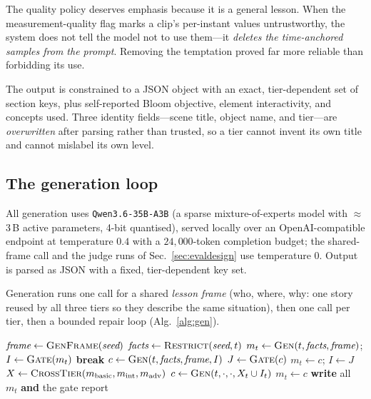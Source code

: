 \documentclass[conference]{IEEEtran}
\begin{document}
The quality policy deserves emphasis because it is a general lesson. When the
measurement-quality flag marks a clip's per-instant values untrustworthy, the
system does not tell the model not to use them---it \emph{deletes the
time-anchored samples from the prompt}. Removing the temptation proved far more
reliable than forbidding its use.

The output is constrained to a JSON object with an exact, tier-dependent set of
section keys, plus self-reported Bloom objective, element interactivity, and
concepts used. Three identity fields---scene title, object name, and tier---are
\emph{overwritten} after parsing rather than trusted, so a tier cannot invent
its own title and cannot mislabel its own level.

\subsection{The generation loop}
\label{sec:loop}

All generation uses \texttt{Qwen3.6-35B-A3B} (a sparse mixture-of-experts model
with $\approx$3\,B active parameters, 4-bit quantised), served locally over an
OpenAI-compatible endpoint at temperature $0.4$ with a $24{,}000$-token
completion budget; the shared-frame call and the judge runs of
Sec.~\ref{sec:evaldesign} use temperature $0$. Output is parsed as JSON with a
fixed, tier-dependent key set.

Generation runs one call for a shared \emph{lesson frame} (who, where, why: one
story reused by all three tiers so they describe the same situation), then one
call per tier, then a bounded repair loop (Alg.~\ref{alg:gen}).

\begin{algorithm}[t]
\caption{Tiered generation with failure-informed repair}
\label{alg:gen}
\footnotesize
\begin{algorithmic}[1]
\State $\textit{frame} \gets \Call{GenFrame}{\textit{seed}}$
  \State $\textit{facts} \gets \Call{Restrict}{\textit{seed}, t}$
  \State $m_t \gets \Call{Gen}{t, \textit{facts}, \textit{frame}}$;\;
         $I \gets \Call{Gate}{m_t}$
     \textbf{break} \EndIf
    \State $c \gets \Call{Gen}{t, \textit{facts}, \textit{frame}, I}$
    \State $J \gets \Call{Gate}{c}$
     $m_t \gets c$;\; $I \gets J$ \EndIf
  \EndFor
\EndFor
\State $X \gets \Call{CrossTier}{m_{\text{basic}}, m_{\text{int}}, m_{\text{adv}}}$
  \State $c \gets \Call{Gen}{t, \cdot, \cdot, X_t \cup I_t}$
   $m_t \gets c$ \EndIf
\EndFor
\State \textbf{write} all $m_t$ \textbf{and} the gate report
\end{algorithmic}
\end{algorithm}
\end{document}
